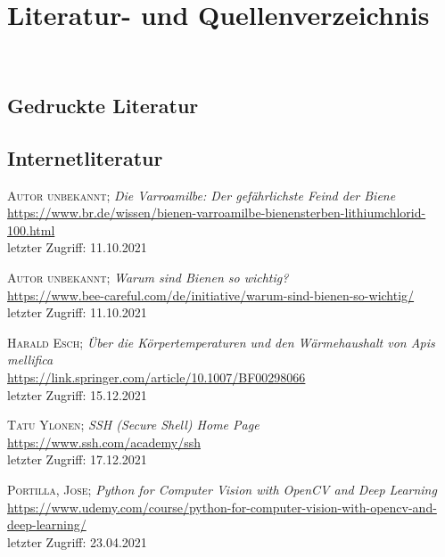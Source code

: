 \documentclass[11pt,a4paper]{article}
\newcommand{\bibLabel}[1]{\label{#1}\hypertarget{#1}{}}
\begin{document}
\section{Literatur- und Quellenverzeichnis}
\begin{thebibliography}
\\
\subsection{Gedruckte Literatur}

\subsection{Internetliteratur}
\setcounter{enumiv}{0}

\label{i1}
	\textsc{Autor unbekannt};
	\textit{Die Varroamilbe: Der gefährlichste Feind der Biene}\\
	\url{https://www.br.de/wissen/bienen-varroamilbe-bienensterben-lithiumchlorid-100.html}\\
	letzter Zugriff: 11.10.2021

\label{i2}
	\textsc{Autor unbekannt};
	\textit{Warum sind Bienen so wichtig?}\\
	\url{https://www.bee-careful.com/de/initiative/warum-sind-bienen-so-wichtig/}\\
	letzter Zugriff: 11.10.2021

 \bibLabel{wechselwarm}
    \textsc{Harald Esch};
    \textit{Über die Körpertemperaturen und den Wärmehaushalt von Apis mellifica}\\
    \url{https://link.springer.com/article/10.1007/BF00298066}\\
    letzter Zugriff: 15.12.2021

 \bibLabel{ssh}
    \textsc{Tatu Ylonen};
    \textit{SSH (Secure Shell) Home Page}\\
    \url{https://www.ssh.com/academy/ssh}\\
    letzter Zugriff: 17.12.2021

 \bibLabel{udemy}
	\textsc{Portilla, Jose};
	\textit{Python for Computer Vision with OpenCV and Deep Learning}\\
	\url{https://www.udemy.com/course/python-for-computer-vision-with-opencv-and-deep-learning/}\\
	letzter Zugriff: 23.04.2021


\end{thebibliography}
\end{document}
